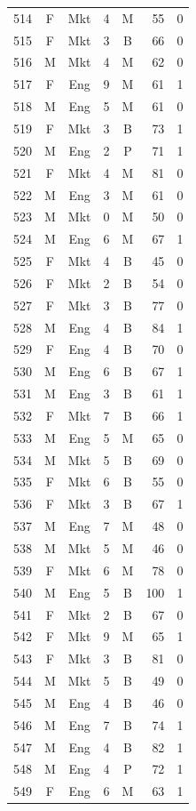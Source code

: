 \documentclass[11pt,a4paper]{article}
\begin{document}
\begin{center}
\begin{tabular}[t]{@{}r c c r c r c@{}}
514 & F & Mkt & 4 & M & 55 & 0 \\
515 & F & Mkt & 3 & B & 66 & 0 \\
516 & M & Mkt & 4 & M & 62 & 0 \\
517 & F & Eng & 9 & M & 61 & 1 \\
518 & M & Eng & 5 & M & 61 & 0 \\
519 & F & Mkt & 3 & B & 73 & 1 \\
520 & M & Eng & 2 & P & 71 & 1 \\
521 & F & Mkt & 4 & M & 81 & 0 \\
522 & M & Eng & 3 & M & 61 & 0 \\
523 & M & Mkt & 0 & M & 50 & 0 \\
524 & M & Eng & 6 & M & 67 & 1 \\
525 & F & Mkt & 4 & B & 45 & 0 \\
526 & F & Mkt & 2 & B & 54 & 0 \\
527 & F & Mkt & 3 & B & 77 & 0 \\
528 & M & Eng & 4 & B & 84 & 1 \\
529 & F & Eng & 4 & B & 70 & 0 \\
530 & M & Eng & 6 & B & 67 & 1 \\
531 & M & Eng & 3 & B & 61 & 1 \\
532 & F & Mkt & 7 & B & 66 & 1 \\
533 & M & Eng & 5 & M & 65 & 0 \\
534 & M & Mkt & 5 & B & 69 & 0 \\
535 & F & Mkt & 6 & B & 55 & 0 \\
536 & F & Mkt & 3 & B & 67 & 1 \\
537 & M & Eng & 7 & M & 48 & 0 \\
538 & M & Mkt & 5 & M & 46 & 0 \\
539 & F & Mkt & 6 & M & 78 & 0 \\
540 & M & Eng & 5 & B & 100 & 1 \\
541 & F & Mkt & 2 & B & 67 & 0 \\
542 & F & Mkt & 9 & M & 65 & 1 \\
543 & F & Mkt & 3 & B & 81 & 0 \\
544 & M & Mkt & 5 & B & 49 & 0 \\
545 & M & Eng & 4 & B & 46 & 0 \\
546 & M & Eng & 7 & B & 74 & 1 \\
547 & M & Eng & 4 & B & 82 & 1 \\
548 & M & Eng & 4 & P & 72 & 1 \\
549 & F & Eng & 6 & M & 63 & 1 \\

\end{tabular}
\end{center}
\end{document}
